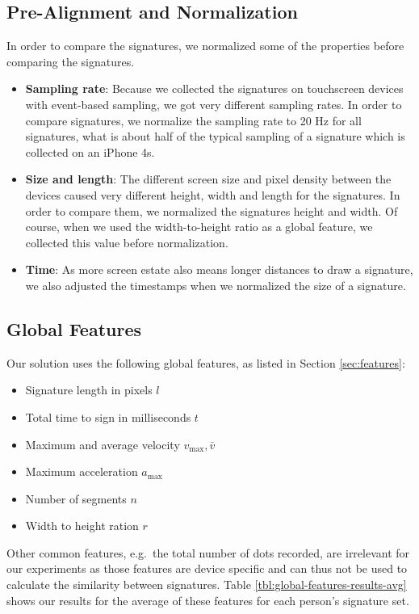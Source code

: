 \documentclass[a4paper, oneside]{csthesis}
\begin{document}
\subsection{Pre-Alignment and Normalization}

In order to compare the signatures, we normalized some of the properties before comparing the signatures.
\begin{itemize}
\item \textbf{Sampling rate}: Because we collected the signatures on touchscreen devices with event-based sampling, we got very different sampling rates. In order to compare signatures, we normalize the sampling rate to 20 Hz for all signatures, what is about half of the typical sampling of a signature which is collected on an iPhone 4s.
\item \textbf{Size and length}: The different screen size and pixel density between the devices caused very different height, width and length for the signatures. In order to compare them, we normalized the signatures height and width. Of course, when we used the width-to-height ratio as a global feature, we collected this value before normalization.
\item \textbf{Time}: As more screen estate also means longer distances to draw a signature, we also adjusted the timestamps when we normalized the size of a signature.
\end{itemize}








\subsection{Global Features}
Our solution uses the following global features, as listed in Section \ref{sec:features}:

\begin{itemize}
\item Signature length in pixels $l$
\item Total time to sign in milliseconds $t$
\item Maximum and average velocity $v_\text{max}, \bar{v}$
\item Maximum acceleration $a_\text{max}$
\item Number of segments $n$
\item Width to height ration $r$
\end{itemize}

Other common features, e.g.\ the total number of dots recorded, are irrelevant for our experiments as those features are device specific and can thus not be used to calculate the similarity between signatures.
Table \ref{tbl:global-features-results-avg} shows our results for the average of these features for each person's signature set.
\end{document}
